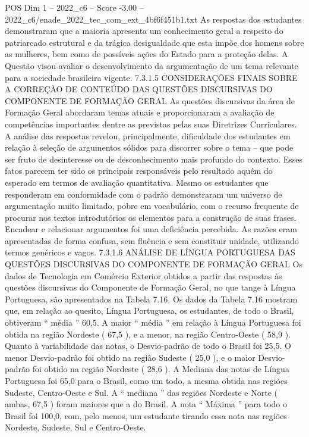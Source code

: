 \begin{textsample}{POS Dim 1 – 2022\_c6 – Score -3.00 – 2022\_c6/enade\_2022\_tec\_com\_ext\_4bf6f451b1.txt}
As respostas dos estudantes demonstraram que a maioria apresenta um conhecimento geral a respeito do patriarcado estrutural e da trágica desigualdade que esta impõe dos homens sobre as mulheres, bem como de possíveis ações do Estado para a proteção delas.
A Questão visou avaliar o desenvolvimento da argumentação de um tema relevante para a sociedade brasileira vigente. 7.3.1.5 CONSIDERAÇÕES FINAIS SOBRE A CORREÇÃO DE CONTEÚDO DAS QUESTÕES DISCURSIVAS DO COMPONENTE DE FORMAÇÃO GERAL As questões discursivas da área de Formação Geral abordaram temas atuais e proporcionaram a avaliação de competências importantes dentre as previstas pelas suas Diretrizes Curriculares.
A análise das respostas revelou, principalmente, dificuldade dos estudantes em relação à seleção de argumentos sólidos para discorrer sobre o tema – que pode ser fruto de desinteresse ou de desconhecimento mais profundo do contexto.
Esses fatos parecem ter sido os principais responsáveis pelo resultado aquém do esperado em termos de avaliação quantitativa.
Mesmo os estudantes que responderam em conformidade com o padrão demonstraram um universo de argumentação muito limitado, pobre em vocabulário, com o recurso frequente de procurar nos textos introdutórios os elementos para a construção de suas frases.
Encadear e relacionar argumentos foi uma deficiência percebida.
As razões eram apresentadas de forma confusa, sem fluência e sem constituir unidade, utilizando termos genéricos e vagos. 7.3.1.6 ANÁLISE DE LÍNGUA PORTUGUESA DAS QUESTÕES DISCURSIVAS DO COMPONENTE DE FORMAÇÃO GERAL Os dados de Tecnologia em Comércio Exterior obtidos a partir das respostas às questões discursivas do Componente de Formação Geral, no que tange à Língua Portuguesa, são apresentados na Tabela 7.16.
Os dados da Tabela 7.16 mostram que, em relação ao quesito, Língua Portuguesa, os estudantes, de todo o Brasil, obtiveram “ média ” 60,5.
A maior “ média ” em relação à Língua Portuguesa foi obtida na região Nordeste ( 67,5 ), e a menor, na região Centro-Oeste ( 58,9 ).
Quanto à variabilidade das notas, o Desvio-padrão de todo o Brasil foi 25,5.
O menor Desvio-padrão foi obtido na região Sudeste ( 25,0 ), e o maior Desvio-padrão foi obtido na região Nordeste ( 28,6 ).
A Mediana das notas de Língua Portuguesa foi 65,0 para o Brasil, como um todo, a mesma obtida nas regiões Sudeste, Centro-Oeste e Sul.
A “ mediana ” das regiões Nordeste e Norte ( ambas, 67,5 ) foram maiores que a do Brasil.
A nota “ Máxima ” para todo o Brasil foi 100,0, com, pelo menos, um estudante tirando essa nota nas regiões Nordeste, Sudeste, Sul e Centro-Oeste.

\end{textsample}
